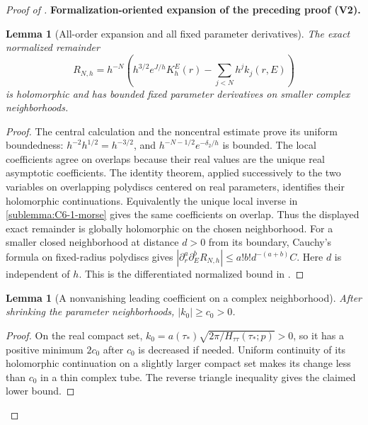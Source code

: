 \documentclass[11pt]{article}
\newtheorem{lemma}[theorem]{Lemma}
\newcommand{\formalisationparentid}{X}
\newenvironment{formalisationaddition}[1]{\par\medskip\begingroup\color{blue}\def\formalisationparentid{#1}\setcounter{formalizationsublemma}{0}\let\lemma\formalizationsublemma\let\endlemma\endformalizationsublemma
  \def\Eo{\mathcal E_h^\circ}\def\EE{\mathcal E_h}\def\phio{\phi_h^\circ}\def\phih{\phi_h}\def\Ho{H_h^{\rm atom}(v^\circ)}\def\Ha{H_h^{\rm atom}}\def\HL{H_h^{L}}\def\Dh{D_h}\def\Log{\operatorname{Log}}\def\ellh{\ell_h}\def\Gp{G_{p,h}}\def\Ast{A_{*,h}}\def\ahat{\widehat{\mathfrak a}_h}\def\ah{\mathfrak a_h}\def\rh{\widehat\rho_h}\def\deltah{\widehat\delta_h}\def\oldref##1{\textup{(##1)}}\def\interface##1{\par\noindent\textit{Analytical interface used here.} ##1\par}\def\finish{\par\noindent\textit{Conclusion of the formalization-oriented expansion.} }\par\noindent\textbf{Formalization-oriented expansion of the preceding proof (V2).}\par\smallskip
}{\par\endgroup\medskip
}
\begin{document}
\begin{proof}[Proof of ]
\begin{formalisationaddition}{C-T6.1}
\begin{lemma}[All-order expansion and all fixed parameter derivatives]\label{sublemma:C6-1-expansion}
The exact normalized remainder
\[
 R_{N,h}=h^{-N}\left(h^{3/2}e^{J/h}K_h^E(r)
                         -\sum_{j<N}h^jk_j(r,E)\right)
\]
is holomorphic and has bounded fixed parameter derivatives on smaller
complex neighborhoods.
\end{lemma}
\begin{proof}
The central calculation and the noncentral estimate prove its uniform
boundedness: $h^{-2}h^{1/2}=h^{-3/2}$, and
$h^{-N-1/2}e^{-\delta_2/h}$ is bounded.
The local coefficients agree on overlaps because their real values are
the unique real asymptotic coefficients. The identity theorem, applied
successively to the two variables on overlapping polydiscs centered on
real parameters, identifies their holomorphic continuations. Equivalently
the unique local inverse in \ref{sublemma:C6-1-morse} gives the same
coefficients on overlap. Thus the displayed exact remainder is globally
holomorphic on the chosen neighborhood.
For a smaller closed neighborhood at distance $d>0$ from its boundary,
Cauchy's formula on fixed-radius polydiscs gives
$|\partial_r^a\partial_E^bR_{N,h}|\le a!b!d^{-(a+b)}C$.
Here $d$ is independent of $h$. This is the differentiated normalized
bound in .
\end{proof}

\begin{lemma}[A nonvanishing leading coefficient on a complex neighborhood]\label{sublemma:C6-1-nonzero-k0}
After shrinking the parameter neighborhoods, $|k_0|\ge c_0>0$.
\end{lemma}
\begin{proof}
On the real compact set,
$k_0=a(\tau_*)\sqrt{2\pi/H_{\tau\tau}(\tau_*;p)}>0$,
so it has a positive minimum $2c_0$ after $c_0$ is decreased if needed.
Uniform continuity of its holomorphic continuation on a slightly larger
compact set makes its change less than $c_0$ in a thin complex tube.
The reverse triangle inequality gives the claimed lower bound.
\end{proof}


\end{formalisationaddition}
\end{proof}
\end{document}
